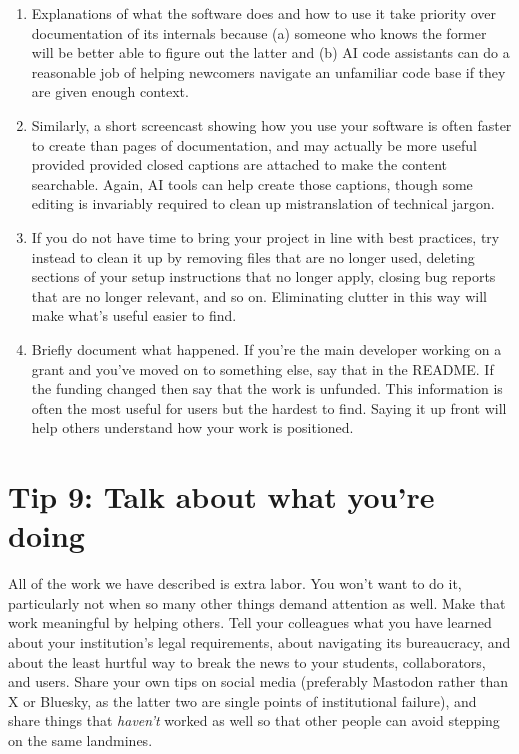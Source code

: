 \documentclass[10pt,letterpaper]{article}
\begin{document}
\begin{enumerate}

\item
  Explanations of what the software does and how to use it
  take priority over documentation of its internals
  because (a) someone who knows the former will be better able to figure out the latter
  and (b) AI code assistants can do a reasonable job of helping newcomers navigate an unfamiliar code base
  if they are given enough context.

\item
  Similarly,
  a short screencast showing how you use your software
  is often faster to create than pages of documentation,
  and may actually be more useful provided provided closed captions are attached
  to make the content searchable.
  Again,
  AI tools can help create those captions,
  though some editing is invariably required to clean up mistranslation of technical jargon.

\item
  If you do not have time to bring your project in line with best practices,
  try instead to clean it up by removing files that are no longer used,
  deleting sections of your setup instructions that no longer apply,
  closing bug reports that are no longer relevant,
  and so on.
  Eliminating clutter in this way will make what's useful easier to find.

\item
  Briefly document what happened.
  If you're the main developer working on a grant and you've moved on to something else,
  say that in the README.
  If the funding changed then say that the work is unfunded.
  This information is often the most useful for users but the hardest to find.
  Saying it up front will help others understand how your work is positioned.

\end{enumerate}

\section*{Tip 9: Talk about what you're doing}

All of the work we have described is extra labor.
You won't want to do it,
particularly not when so many other things demand attention as well.
Make that work meaningful by helping others.
Tell your colleagues what you have learned about your institution's legal requirements,
about navigating its bureaucracy,
and about the least hurtful way to break the news to your students, collaborators, and users.
Share your own tips on social media
(preferably Mastodon rather than X or Bluesky,
as the latter two are single points of institutional failure),
and share things that \emph{haven't} worked as well
so that other people can avoid stepping on the same landmines.
\end{document}
